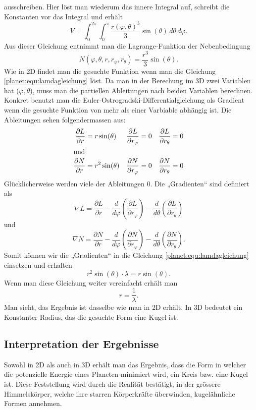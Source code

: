 ausschreiben.
Hier löst man wiederum das innere Integral auf, schreibt die Konstanten vor das Integral und erhält
\begin{equation*}
	V = \int_{0}^{2\pi}\int_{0}^{\pi}\frac{r(\varphi,\theta)^3}{3} \sin (\theta) \, d\theta \, d\varphi.
\end{equation*}
Aus dieser Gleichung entnimmt man die Lagrange-Funktion der Nebenbedingung
\begin{equation*}
	N(\varphi,\theta ,r,r_\varphi,r_\theta) = \frac{r^3}{3} \sin (\theta).
\end{equation*}
Wie in 2D findet man die gesuchte Funktion wenn man die Gleichung \eqref{planet:equ:lamdagleichung} löst.
Da man in der Berechung im 3D zwei Variablen hat (\(\varphi,\theta\)), muss man die partiellen Ableitungen nach beiden Variablen berechnen.
Konkret benutzt man die Euler-Ostrogradski-Differentialgleichung als Gradient wenn die gesuchte Funktion von mehr als einer Varbiable abhängig ist.
Die Ableitungen sehen folgendermassen aus:
\begin{align*}
	\frac{\partial L}{\partial r} &= r  \sin (\theta)& \frac{\partial L}{\partial r_\varphi} &= 0& \frac{\partial L}{\partial r_\theta} &= 0 \\
\intertext{und}
	\frac{\partial N}{\partial r} &= r^2\sin (\theta)&	\frac{\partial N}{\partial r_\varphi} &= 0&	\frac{\partial N}{\partial r_\theta} &= 0
\end{align*}
Glücklicherweise werden viele der Ableitungen 0.
Die „Gradienten“ sind definiert als
\begin{equation*}
	\nabla L =  \frac{\partial L}{\partial r} 
	-\frac{d}{d\varphi}\left( \frac{\partial L}{\partial r_\varphi} \right)
	-\frac{d}{d\theta}\left( \frac{\partial L}{\partial r_\theta} \right)
\end{equation*}
und
\begin{equation*}
	\nabla N=  \frac{\partial N}{\partial r} 
	-\frac{d}{d\varphi}\left( \frac{\partial N}{\partial r_\varphi} \right)
	-\frac{d}{d\theta}\left( \frac{\partial N}{\partial r_\theta} \right).
\end{equation*}
Somit können wir die „Gradienten“ in die Gleichung \eqref{planet:equ:lamdagleichung} einsetzen und erhalten
\begin{equation*}
	r^2\sin (\theta) \cdot \lambda = r \sin (\theta).
\end{equation*}
Wenn man diese Gleichung weiter vereinfacht erhält man
\begin{equation*}
	r = \frac{1}{\lambda}.
\end{equation*}
Man sieht, das Ergebnis ist dasselbe wie man in 2D erhält.
In 3D bedeutet ein Konstanter Radius, das die gesuchte Form eine Kugel ist.

\subsection{Interpretation der Ergebnisse}
Sowohl in 2D als auch in 3D erhält man das Ergebnis, dass die Form in welcher die potenzielle Energie eines Planeten minimiert wird, ein Kreis bzw. eine Kugel ist.
Diese Feststellung wird durch die Realität bestätigt, in der grössere Himmelskörper, welche ihre starren Körperkräfte überwinden, kugelähnliche Formen annehmen.

